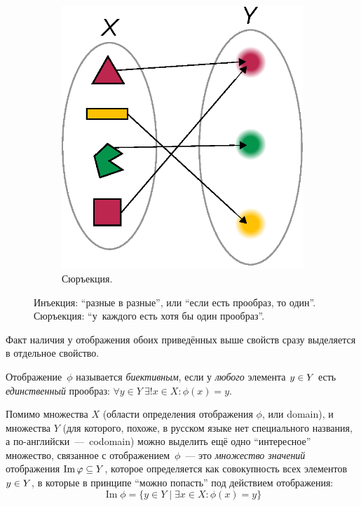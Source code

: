 \documentclass[a4paper,12pt]{article}
\DeclareMathOperator{\Imag}{Im}
\begin{document}
\begin{figure}[h]
\begin{subfigure}[b]{0.3\textwidth}
      \centering
      \includegraphics[width=\columnwidth]{surjection}
  
      \caption{Сюръекция.}
      \label{fig:surjection}
    \end{subfigure}
    
    \caption{Инъекция: ``разные в разные'', или ``если есть прообраз, то один''. Сюръекция: ``у~каждого есть хотя бы один прообраз''.}
  \end{figure}
  
  Факт наличия у отображения обоих приведённых выше свойств сразу выделяется в отдельное свойство.
  
  \begin{definition}
    Отображение~$\phi$ называется \emph{биективным}, если у \emph{любого} элемента $y \hm\in Y$ есть \emph{единственный} прообраз:
    $
      \forall y \in Y\ \exists ! x \in X\colon \phi(x) = y
    $.
  \end{definition}
  
  Помимо множества $X$ (области определения отображения $\phi$, или domain), и множества $Y$ (для которого, похоже, в русском языке нет специального названия, а по-английски~---~codomain) можно выделить ещё одно ``интересное'' множество, связанное с отображением~$\phi$~--- это \emph{множество значений} отображения $\Imag \phi \hm\subseteq Y$, которое определяется как совокупность всех элементов $y \hm\in Y$, в которые в принципе ``можно попасть'' под действием отображения:
  \[
    \Imag \phi = \{y \in Y \mid \exists x \in X\colon \phi(x) = y\}
  \]
  
\end{document}
